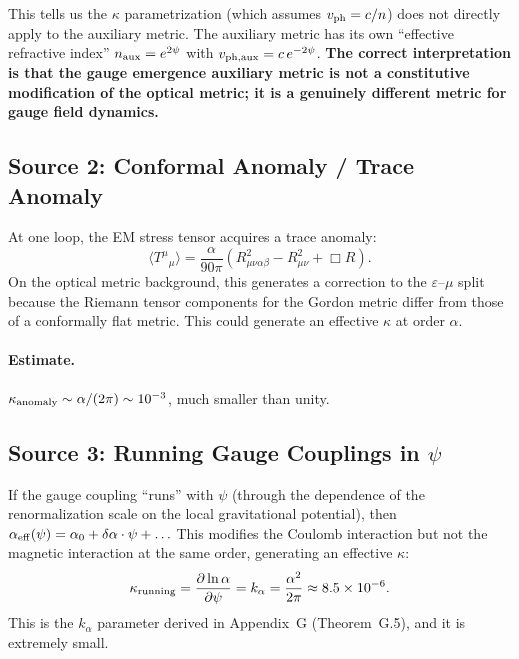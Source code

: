 \documentclass[11pt,a4paper]{article}
\theoremstyle{definition}
\theoremstyle{remark}
\begin{document}
This tells us the $\kappa$ parametrization (which assumes
$v_{\rm ph} = c/n$) does not directly apply to the auxiliary metric.
The auxiliary metric has its own ``effective refractive index''
$n_{\rm aux} = e^{2\psi}$ with $v_{\rm ph,aux} = c\,e^{-2\psi}$.
\textbf{The correct interpretation is that the gauge emergence
auxiliary metric is not a constitutive modification of the optical
metric; it is a genuinely different metric for gauge field dynamics.}

\subsection{Source 2: Conformal Anomaly / Trace Anomaly}

At one loop, the EM stress tensor acquires a trace anomaly:
\begin{equation}
\langle T^\mu{}_\mu \rangle = \frac{\alpha}{90\pi}\left(R_{\mu\nu\alpha\beta}^2
- R_{\mu\nu}^2 + \Box R\right).
\end{equation}
On the optical metric background, this generates a correction to the
$\varepsilon$--$\mu$ split because the Riemann tensor components for
the Gordon metric differ from those of a conformally flat metric.
This could generate an effective $\kappa$ at order $\alpha$.

\paragraph{Estimate.}
$\kappa_{\rm anomaly} \sim \alpha/(2\pi) \sim 10^{-3}$, much smaller
than unity.

\subsection{Source 3: Running Gauge Couplings in $\psi$}

If the gauge coupling ``runs'' with $\psi$ (through the dependence
of the renormalization scale on the local gravitational potential),
then $\alpha_{\rm eff}(\psi) = \alpha_0 + \delta\alpha\cdot\psi + \ldots$
This modifies the Coulomb interaction but not the magnetic interaction
at the same order, generating an effective $\kappa$:
\begin{equation}
\kappa_{\rm running} = \frac{\partial\ln\alpha}{\partial\psi}
= k_\alpha = \frac{\alpha^2}{2\pi} \approx 8.5 \times 10^{-6}.
\end{equation}
This is the $k_\alpha$ parameter derived in Appendix~G
(Theorem~G.5), and it is extremely small.
\end{document}
